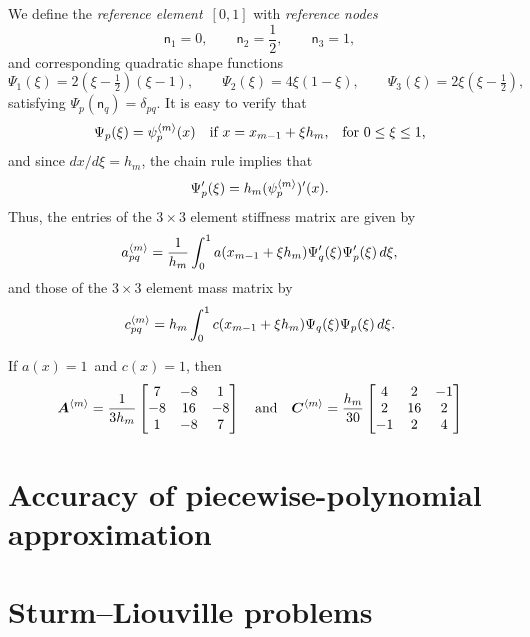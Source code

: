 We define the \emph{reference element}~$[0,1]$ with \emph{reference nodes}
\[
\mathsf{n}_1=0,\qquad\mathsf{n}_2=\frac{1}{2},\qquad\mathsf{n}_3=1,
\]
and corresponding quadratic shape functions
\begin{equation}\label{eq: quadratic shape funcs 1d}
\Psi_1(\xi)=2(\xi-\tfrac12)(\xi-1),\qquad
\Psi_2(\xi)=4\xi(1-\xi),\qquad
\Psi_3(\xi)=2\xi(\xi-\tfrac12),
\end{equation}
satisfying $\Psi_p(\mathsf{n}_q)=\delta_{pq}$.  It is easy to verify that
\[
\Psi_p(\xi)=\psi^{\langle m\rangle}_p(x)\quad
	\text{if $x=x_{m-1}+\xi h_m$,}\quad\text{for $0\le\xi\le1$,}
\]
and since $dx/d\xi=h_m$, the chain rule implies that
\[
\Psi'_p(\xi)=h_m(\psi^{\langle m\rangle}_p)'(x).
\]
Thus, the entries of the $3\times3$ element stiffness matrix are given by
\begin{equation}\label{eq: a mpq reference 1d}
a^{\langle m\rangle}_{pq}=\frac{1}{h_m}\int_0^1a(x_{m-1}+\xi h_m)
	\Psi'_q(\xi)\Psi'_p(\xi)\,d\xi,
\end{equation}
and those of the $3\times3$ element mass matrix by
\begin{equation}\label{eq: c mpq reference 1d}
c^{\langle m\rangle}_{pq}=h_m\int_0^1c(x_{m-1}+\xi h_m)
	\Psi_q(\xi)\Psi_p(\xi)\,d\xi.
\end{equation}

\begin{example}
If $a(x)=1$~and $c(x)=1$, then
\begin{equation}\label{eq: element matrices quadratic 1d}
\boldsymbol{A}^{\langle m\rangle}=\frac{1}{3h_m}\begin{bmatrix}
 7&-8& 1\\
-8&16&-8\\
 1&-8& 7\end{bmatrix}
\quad\text{and}\quad
\boldsymbol{C}^{\langle m\rangle}=\frac{h_m}{30}\begin{bmatrix}
 4& 2&-1\\
 2&16& 2\\
-1& 2& 4 \end{bmatrix}
\end{equation}
\end{example}


\section{Accuracy of piecewise-polynomial approximation}

\section{Sturm--Liouville problems}

